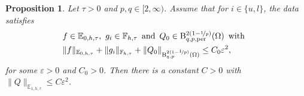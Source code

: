 \documentclass[10pt,a4paper]{amsart}
\newtheorem{prop}{Proposition}
\newcommand{\E}{\mathbb{E}}
\newcommand{\F}{\mathbb{F}}
\newcommand{\eps}{\varepsilon}
\newcommand{\per}{\mathrm{per}}
\newcommand{\rB}{\mathrm{B}}
\newcommand{\tand}{\enspace \text{and} \enspace}
\newcommand{\twith}{\enspace \text{with} \enspace}
\begin{document}
\begin{prop}
    \label{prop: est on q}
    Let $\tau >0$ and $p,q \in [2,\infty)$. Assume that for $i \in \{ u,l\}$, the data satisfies
    \begin{equation}\label{eq: assu q}
        \begin{aligned}
            &f \in \E_{0,h,\tau}, \ g_i \in \F_{h,\tau}   \tand Q_0 \in \rB_{q,p,\per}^{2(1-\nicefrac{1}{p})}(\Omega) \twith\\
            &\| f \|_{\E_{0,h,\tau}} + \| g_i \|_{\F_{h,\tau}} +\|Q_0 \|_{\rB^{2(1-\nicefrac{1}{p})}_{q,p}(\Omega) } \leq C_0\eps^2 ,
        \end{aligned}
    \end{equation}
    for some $\eps>0$ and $C_0>0$. 
    Then there is a constant $C>0$ with $\| Q \|_{\E_{1,h,\tau}} \leq C \eps^2$.
\end{prop}
\end{document}

